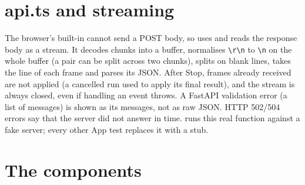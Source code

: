 \section{api.ts and streaming}
\label{sec:apits}

The browser's built-in  cannot send a POST body, so  uses  and reads the response body as a stream. It decodes chunks into a buffer, normalises \texttt{\textbackslash r\textbackslash n} to \texttt{\textbackslash n} on the whole buffer (a pair can be split across two chunks), splits on blank lines, takes the  line of each frame and parses its JSON. After Stop, frames already received are not applied (a cancelled run used to apply its final result), and the stream is always closed, even if handling an event throws. A FastAPI validation error (a list of messages) is shown as its messages, not as raw JSON. HTTP 502/504 errors say that the server did not answer in time.  runs this real function against a fake server; every other App test replaces it with a stub.

\section{The components}

